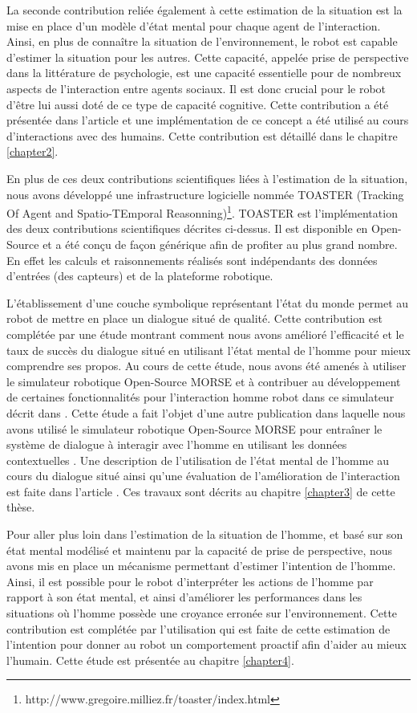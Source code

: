 \documentclass[a4paper,11pt,twoside]{StyleThese}
\begin{document}
La seconde contribution reliée également à cette estimation de la situation est la mise en place d'un modèle d'état mental pour chaque agent de l'interaction. Ainsi, en plus de connaître la situation de l'environnement, le robot est capable d'estimer la situation pour les autres. Cette capacité, appelée prise de perspective dans la littérature de psychologie, est une capacité essentielle pour de nombreux aspects de l'interaction entre agents sociaux. Il est donc crucial pour le robot d'être lui aussi doté de ce type de capacité cognitive. Cette contribution a été présentée dans l'article \cite{Milliez2014} et une implémentation de ce  concept a été utilisé au cours d'interactions avec des humains. 
Cette contribution est détaillé dans le chapitre \ref{chapter2}.

En plus de ces deux contributions scientifiques liées à l'estimation de la situation, nous avons développé une infrastructure logicielle nommée TOASTER (Tracking Of Agent and Spatio-TEmporal Reasonning)\footnote{http://www.gregoire.milliez.fr/toaster/index.html}. TOASTER est l'implémentation des deux contributions scientifiques décrites ci-dessus. Il est disponible en Open-Source et a été conçu de façon générique afin de profiter au plus grand nombre. En effet les calculs et raisonnements réalisés sont indépendants des données d'entrées (des capteurs) et de la plateforme robotique.

L'établissement d'une couche symbolique représentant l'état du monde permet au robot de mettre en place un dialogue situé de qualité. Cette contribution est complétée par une étude montrant comment nous avons amélioré l'efficacité et le taux de succès du dialogue situé en utilisant l'état mental de l'homme pour mieux comprendre ses propos. Au cours de cette étude, nous avons été amenés à utiliser le simulateur robotique Open-Source MORSE et à contribuer au développement de certaines fonctionnalités pour l'interaction homme robot dans ce simulateur décrit dans \cite{simparmorse2014}. Cette étude a fait l'objet d'une autre publication dans laquelle nous avons utilisé le simulateur robotique Open-Source MORSE pour entraîner le système de dialogue à interagir avec l'homme en utilisant les données contextuelles \cite{simpar_2014}. Une description de l'utilisation de l'état mental de l'homme au cours du dialogue situé ainsi qu'une évaluation de l'amélioration de l'interaction est faite dans l'article \cite{Ferreira2015}. Ces travaux sont décrits au chapitre \ref{chapter3} de cette thèse.


Pour aller plus loin dans l'estimation de la situation de l'homme, et basé sur son état mental modélisé et maintenu par la capacité de prise de perspective, nous avons mis en place un mécanisme permettant d'estimer l'intention de l'homme. Ainsi, il est possible pour le robot d'interpréter les actions de l'homme par rapport à son état mental, et ainsi d'améliorer les performances dans les situations où l'homme possède une croyance erronée sur l'environnement. Cette contribution est complétée par l'utilisation qui est faite de cette estimation de l'intention pour donner au robot un comportement proactif afin d'aider au mieux l'humain. Cette étude est présentée au chapitre \ref{chapter4}.
\end{document}
